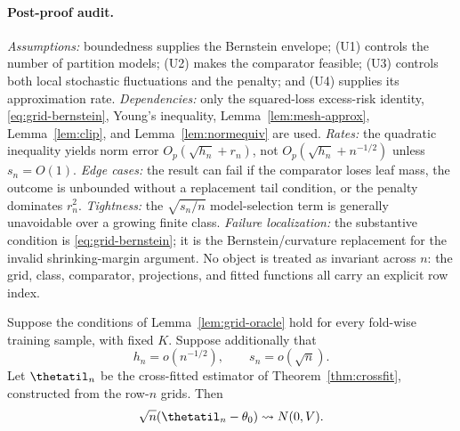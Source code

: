 \paragraph{Post-proof audit.}
\emph{Assumptions:} boundedness supplies the Bernstein envelope; (U1) controls
the number of partition models; (U2) makes the comparator feasible; (U3)
controls both local stochastic fluctuations and the penalty; and (U4) supplies
its approximation rate.
\emph{Dependencies:} only the squared-loss excess-risk identity,
\eqref{eq:grid-bernstein}, Young's inequality,
Lemma~\ref{lem:mesh-approx}, Lemma~\ref{lem:clip}, and
Lemma~\ref{lem:normequiv} are used.
\emph{Rates:} the quadratic inequality yields norm error
$O_p(\sqrt{h_n}+r_n)$, not $O_p(\sqrt{h_n}+n^{-1/2})$ unless
$s_n=O(1)$.
\emph{Edge cases:} the result can fail if the comparator loses leaf mass, the
outcome is unbounded without a replacement tail condition, or the penalty
dominates $r_n^2$.
\emph{Tightness:} the $\sqrt{s_n/n}$ model-selection term is generally
unavoidable over a growing finite class.
\emph{Failure localization:} the substantive condition is
\eqref{eq:grid-bernstein}; it is the Bernstein/curvature replacement for the
invalid shrinking-margin argument.
No object is treated as invariant across $n$: the grid, class, comparator,
projections, and fitted functions all carry an explicit row index.

\begin{corollary}
\label{cor:grid-crossfit}
Suppose the conditions of Lemma~\ref{lem:grid-oracle} hold for every fold-wise
training sample, with fixed $K$.  Suppose additionally that
\[
  h_n=o(n^{-1/2}),
  \qquad
  s_n=o(\sqrt n).
  \label{eq:grid-rootn}
\]
Let $\thetatil_n$ be the cross-fitted estimator of
Theorem~\ref{thm:crossfit}, constructed from the row-$n$ grids.  Then
\[
  \sqrt n(\thetatil_n-\theta_0)\rightsquigarrow N(0,V).
\]
\end{corollary}

